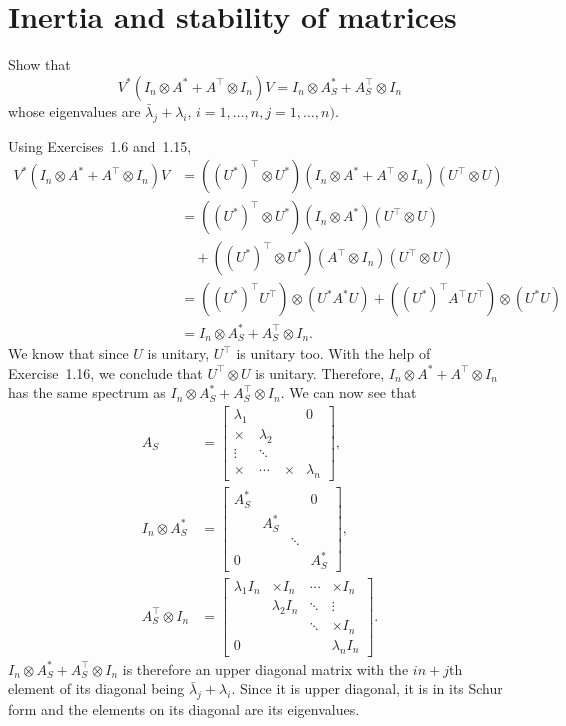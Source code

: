 \section{Inertia and stability of matrices}
Show that
\[
V^*(I_n \otimes A^* + A^\top \otimes I_n) V = I_n \otimes A^*_S + A_S^\top \otimes I_n
\]
whose eigenvalues are \(\bar{\lambda}_j + \lambda_i\), \(i = 1, \dots, n, j = 1, \dots, n)\).

\begin{solution}
	Using Exercises~1.6 and~1.15,
	\begin{align*}
	V^* (I_n \otimes A^* + A^\top \otimes I_n) V
	& = ((U^*)^\top \otimes U^*) (I_n \otimes A^* + A^\top \otimes I_n) (U^\top \otimes U)\\
	& = ((U^*)^\top \otimes U^*) (I_n \otimes A^*) (U^\top \otimes U)\\
	& \quad + ((U^*)^\top \otimes U^*) (A^\top \otimes I_n) (U^\top \otimes U)\\
	& = ((U^*)^\top U^\top) \otimes (U^*A^*U) + ((U^*)^\top A^\top U^\top) \otimes (U^*U)\\
	& = I_n \otimes A_S^* + A_S^\top \otimes I_n.
	\end{align*}
	We know that since $U$ is unitary, $U^\top$ is unitary too.
	With the help of Exercise~1.16, we conclude that $U^\top \otimes U$ is unitary.
	Therefore,
	$I_n \otimes A^* + A^\top \otimes I_n$ has the same spectrum as
	$I_n \otimes A_S^* + A_S^\top \otimes I_n$.
	We can now see that
	\begin{align*}
	A_S & =
	\begin{bmatrix}
	\lambda_1 &           &        & 0\\
	\times    & \lambda_2 &        & \\
	\vdots    & \ddots    &        & \\
	\times    & \cdots    & \times & \lambda_n
	\end{bmatrix},\\
	I_n \otimes A_S^* & =
	\begin{bmatrix}
	A_S^* &       &        & 0\\
	& A_S^* &        & \\
	&       & \ddots & \\
	0     &       &        & A_S^*
	\end{bmatrix},\\
	A_S^\top \otimes I_n & =
	\begin{bmatrix}
	\lambda_1 I_n & \times I_n    & \cdots & \times I_n\\
	& \lambda_2 I_n & \ddots & \vdots\\
	&               & \ddots & \times I_n\\
	0             &               &        & \lambda_n I_n
	\end{bmatrix}.
	\end{align*}
	$I_n \otimes A_S^* + A_S^\top \otimes I_n$ is therefore an
	upper diagonal matrix with the $in + j$th element of its
	diagonal being $\bar{\lambda}_j + \lambda_i$.
	Since it is upper diagonal, it is in its Schur form
	and the elements on its diagonal are its eigenvalues.
\end{solution}

